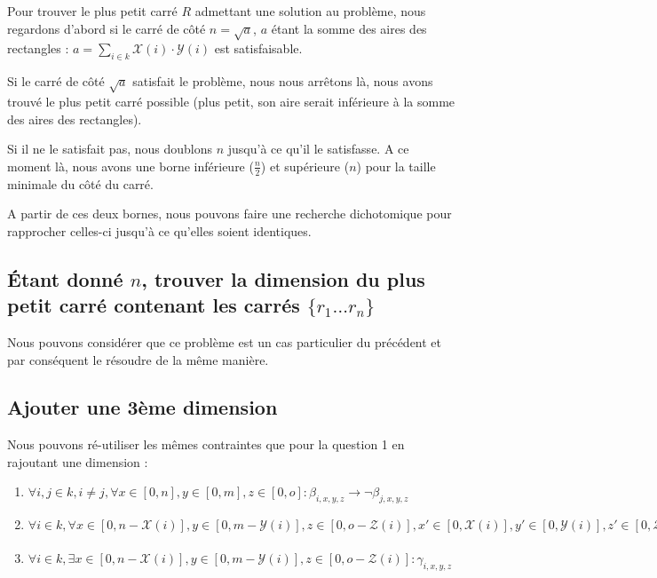 \documentclass[a4paper]{article}
\begin{document}
Pour trouver le plus petit carré $R$ admettant une solution au problème, nous regardons d'abord si le carré de côté $n=\sqrt{a}$, $a$ étant la somme des aires des rectangles : $a = \sum_{i \in k} \mathcal{X}(i) \cdot \mathcal{Y}(i)$ est satisfaisable.

Si le carré de côté $\sqrt{a}$ satisfait le problème, nous nous arrêtons là, nous avons trouvé le plus petit carré possible (plus petit, son aire serait inférieure à la somme des aires des rectangles).

Si il ne le satisfait pas, nous doublons $n$ jusqu'à ce qu'il le satisfasse. A ce moment là, nous avons une borne inférieure ($\frac{n}{2}$) et supérieure ($n$) pour la taille minimale du côté du carré.

A partir de ces deux bornes, nous pouvons faire une recherche dichotomique pour rapprocher celles-ci jusqu'à ce qu'elles soient identiques.

\subsection{Étant donné $n$, trouver la dimension du plus petit carré contenant les carrés $\{r_1 \ldots r_n \}$}

Nous pouvons considérer que ce problème est un cas particulier du précédent et par conséquent le résoudre de la même manière.

\subsection{Ajouter une 3ème dimension}
Nous pouvons ré-utiliser les mêmes contraintes que pour la question 1 en rajoutant une dimension :

\begin{enumerate}
  \item $\forall i,j \in k, i \neq j, \forall x \in [0,n], y \in [0,m], z \in [0,o] : \beta_{i, x, y, z} \rightarrow \lnot \beta_{j, x, y, z}$

  \item $
  \forall i \in k,
  \forall x \in [0, n - \mathcal{X}(i)] , y \in [0, m - \mathcal{Y}(i)], z \in [0, o - \mathcal{Z}(i)],
    x' \in [0, \mathcal{X}(i)], y' \in [0, \mathcal{Y}(i)], z' \in [0, \mathcal{Z}(i)]  :
    \gamma_{i, x, y, z} \rightarrow \beta_{i, x', y', z'}
  $

  \item $\forall i \in k, \exists x \in  [0, n - \mathcal{X}(i)], y \in [0, m - \mathcal{Y}(i)], z \in [0, o - \mathcal{Z}(i)] :
  \gamma_{i, x, y, z}$
\end{enumerate}
\vspace{1em}
\end{document}
